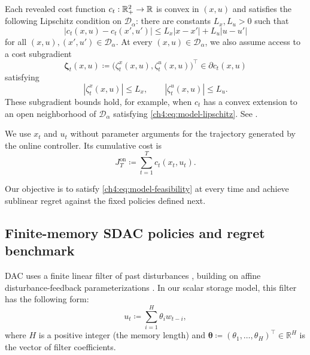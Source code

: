 Each revealed cost function $c_t:\mathbb{R}_+^2\to\mathbb{R}$ is convex in
$(x,u)$ and satisfies the following Lipschitz condition on $\mathcal{D}_\alpha$:
there are constants $L_x,L_u>0$ such that
\begin{equation}
\label{ch4:eq:model-lipschitz}
|c_t(x,u)-c_t(x',u')|
\le
L_x|x-x'|+L_u|u-u'|
\end{equation}
for all $(x,u),(x',u')\in\mathcal{D}_\alpha$.
At every $(x,u)\in\mathcal{D}_\alpha$, we also assume access to a cost subgradient
\begin{equation}
\label{ch4:eq:model-cost-subgradient}
\boldsymbol{\zeta}_t(x,u)
\coloneqq
\bigl(\zeta_t^x(x,u),\zeta_t^u(x,u)\bigr)^\top
\in\partial c_t(x,u)
\end{equation}
satisfying
\begin{equation}
\label{ch4:eq:model-subgradient-bounds}
|\zeta_t^x(x,u)|\le L_x,
\qquad
|\zeta_t^u(x,u)|\le L_u.
\end{equation}
These subgradient bounds hold, for example, when $c_t$ has a convex
extension to an open neighborhood of $\mathcal{D}_\alpha$ satisfying
\eqref{ch4:eq:model-lipschitz}. See
\cite[Thm.~9.13]{rockafellar1998variational}.

We use $x_t$ and $u_t$ without parameter arguments for the trajectory generated by
the online controller. Its cumulative cost is
\begin{equation}
\label{ch4:eq:def-cumulative-cost}
J_T^{\mathrm{on}}
\coloneqq
\sum_{t=1}^T c_t(x_t,u_t).
\end{equation}


Our objective is to satisfy \eqref{ch4:eq:model-feasibility} at every time and achieve
sublinear regret against the fixed policies defined next.

\subsection{Finite-memory SDAC policies and regret benchmark}
\label{ch4:sec:sdac}

DAC uses a finite linear filter of past disturbances
\cite{agarwal2019online}, building on affine disturbance-feedback
parameterizations \cite{goulart2006optimization}. In our scalar storage
model, this filter has the following form:
\begin{equation}
\label{ch4:eq:dac-param}
u_t \coloneqq \sum_{i=1}^{H} \theta_i w_{t-i},
\end{equation}
where $H$ is a positive integer (the memory length) and
$\boldsymbol{\theta}\coloneqq(\theta_1,\ldots,\theta_H)^\top\in\mathbb{R}^H$ is the vector
of filter coefficients.

